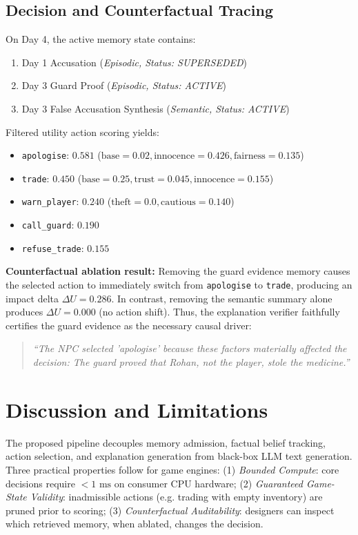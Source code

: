 \documentclass[conference]{IEEEtran}
\begin{document}
\subsection{Decision and Counterfactual Tracing}
On Day 4, the active memory state contains:
\begin{enumerate}
    \item Day 1 Accusation (\textit{Episodic, Status: SUPERSEDED})
    \item Day 3 Guard Proof (\textit{Episodic, Status: ACTIVE})
    \item Day 3 False Accusation Synthesis (\textit{Semantic, Status: ACTIVE})
\end{enumerate}
Filtered utility action scoring yields:
\begin{itemize}
    \item \texttt{apologise}: $\mathbf{0.581}$ ($\text{base}=0.02, \text{innocence}=0.426, \text{fairness}=0.135$)
    \item \texttt{trade}: $\mathbf{0.450}$ ($\text{base}=0.25, \text{trust}=0.045, \text{innocence}=0.155$)
    \item \texttt{warn\_player}: $0.240$ ($\text{theft}=0.0, \text{cautious}=0.140$)
    \item \texttt{call\_guard}: $0.190$
    \item \texttt{refuse\_trade}: $0.155$
\end{itemize}

\textbf{Counterfactual ablation result:} Removing the guard evidence memory causes the selected action to immediately switch from \texttt{apologise} to \texttt{trade}, producing an impact delta $\Delta U = 0.286$. In contrast, removing the semantic summary alone produces $\Delta U = 0.000$ (no action shift). Thus, the explanation verifier faithfully certifies the guard evidence as the necessary causal driver:
\begin{quote}
\textit{``The NPC selected 'apologise' because these factors materially affected the decision: The guard proved that Rohan, not the player, stole the medicine.''}
\end{quote}

\section{Discussion and Limitations}
The proposed pipeline decouples memory admission, factual belief tracking, action selection, and explanation generation from black-box LLM text generation. Three practical properties follow for game engines: (1) \textit{Bounded Compute}: core decisions require $<1\text{ ms}$ on consumer CPU hardware; (2) \textit{Guaranteed Game-State Validity}: inadmissible actions (e.g. trading with empty inventory) are pruned prior to scoring; (3) \textit{Counterfactual Auditability}: designers can inspect which retrieved memory, when ablated, changes the decision.
\end{document}
